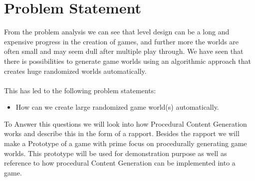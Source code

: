 \section{Problem Statement}

From the problem analysis we can see that level design can be a long and expensive progress in the creation of games, and further more the worlds are often small and may seem dull after multiple play through. We have seen that there is possibilities to generate game worlds using an algorithmic approach that creates huge randomized worlds automatically.
\\\\
This has led to the following problem statements:

\begin{itemize}
\item How can we create large randomized game world(s) automatically.
\end{itemize}

To Answer this questions we will look into how Procedural Content Generation works and describe this in the form of a rapport. Besides the rapport we will make a Prototype of a game with prime focus on procedurally generating game worlds. This prototype will be used for demonstration purpose as well as reference to how procedural Content Generation can be implemented into a game.